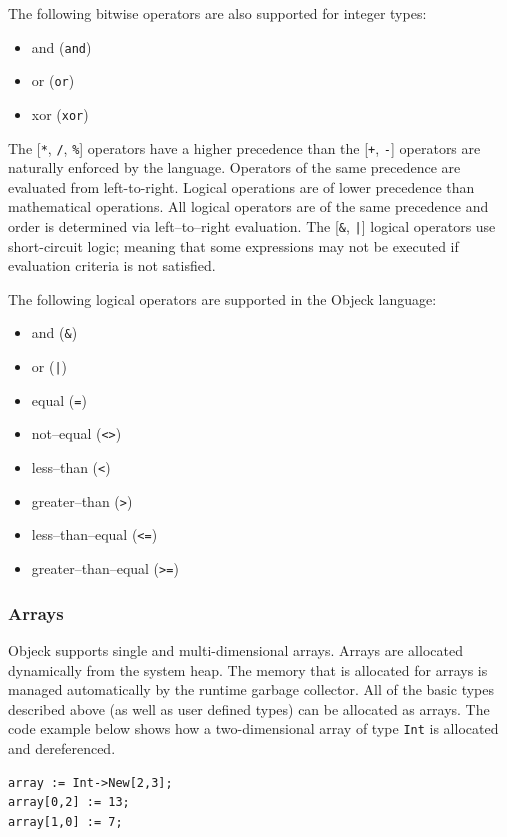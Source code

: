 \documentclass[12pt]{article}
\begin{document}
The following bitwise operators are also supported for integer types:
\begin{itemize}
    \item and (\texttt{and})
    \item or (\texttt{or})
    \item xor (\texttt{xor})
\end{itemize}

The [\texttt{*}, \texttt{/}, \texttt{\%}] operators have a higher
precedence than  the [\texttt{+}, \texttt{-}] operators are naturally
enforced by the language. Operators of the same precedence are evaluated from left-to-right.  Logical operations are of lower precedence than mathematical operations. All logical operators are of the same precedence and order is determined via left--to--right evaluation.  The [\texttt{\&}, \texttt{|}] logical operators use short-circuit logic; meaning that some expressions may not be executed if evaluation criteria is not satisfied.

The following logical operators are supported in the Objeck language:
\begin{itemize}
    \item and (\texttt{\&})
    \item or (\texttt{|})
    \item equal (\texttt{=})
    \item not--equal (\texttt{<>})
    \item less--than (\texttt{<})
    \item greater--than (\texttt{>})
    \item less--than--equal (\texttt{<=})
    \item greater--than--equal (\texttt{>=})
\end{itemize}

\subsubsection{Arrays}
Objeck supports single and multi-dimensional arrays.  Arrays are allocated dynamically from the system heap.  The memory that is allocated for arrays is managed automatically by the runtime garbage collector.  All of the basic types described above (as well as user defined types) can be allocated as arrays.  The code example below shows how a two-dimensional array of type \texttt{Int} is allocated and dereferenced.


\begin{verbatim}
array := Int->New[2,3];
array[0,2] := 13;
array[1,0] := 7;
\end{verbatim}
\end{document}
